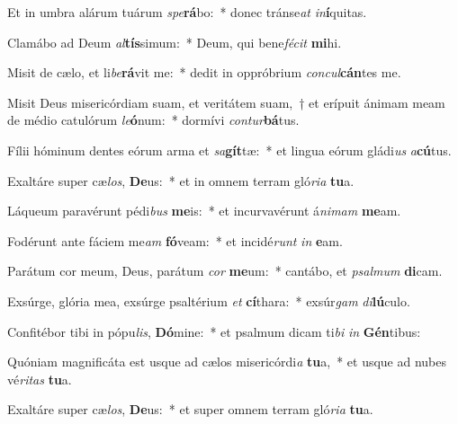 \item Et in umbra alárum tuárum \textit{spe}\textbf{rá}bo:~* donec tránse\textit{at} \textit{in}\textbf{í}quitas.
\item Clamábo ad Deum \textit{al}\textbf{tís}simum:~* Deum, qui bene\textit{fé}\textit{cit} \textbf{mi}hi.
\item Misit de cælo, et li\textit{be}\textbf{rá}vit me:~* dedit in oppróbrium \textit{con}\textit{cul}\textbf{cán}tes me.
\item Misit Deus misericórdiam suam, et veritátem suam,~† et erípuit ánimam meam de médio catulórum \textit{le}\textbf{ó}num:~* dormívi \textit{con}\textit{tur}\textbf{bá}tus.
\item Fílii hóminum dentes eórum arma et \textit{sa}\textbf{gít}tæ:~* et lingua eórum gládi\textit{us} \textit{a}\textbf{cú}tus.
\item Exaltáre super cæ\textit{los}, \textbf{De}us:~* et in omnem terram gló\textit{ri}\textit{a} \textbf{tu}a.
\item Láqueum paravérunt pédi\textit{bus} \textbf{me}is:~* et incurvavérunt á\textit{ni}\textit{mam} \textbf{me}am.
\item Fodérunt ante fáciem me\textit{am} \textbf{fó}veam:~* et incidé\textit{runt} \textit{in} \textbf{e}am.
\item Parátum cor meum, Deus, parátum \textit{cor} \textbf{me}um:~* cantábo, et \textit{psal}\textit{mum} \textbf{di}cam.
\item Exsúrge, glória mea, exsúrge psaltérium \textit{et} \textbf{cí}thara:~* exsúr\textit{gam} \textit{di}\textbf{lú}culo.
\item Confitébor tibi in pópu\textit{lis}, \textbf{Dó}mine:~* et psalmum dicam ti\textit{bi} \textit{in} \textbf{Gén}tibus:
\item Quóniam magnificáta est usque ad cælos misericórdi\textit{a} \textbf{tu}a,~* et usque ad nubes vé\textit{ri}\textit{tas} \textbf{tu}a.
\item Exaltáre super cæ\textit{los}, \textbf{De}us:~* et super omnem terram gló\textit{ri}\textit{a} \textbf{tu}a.
